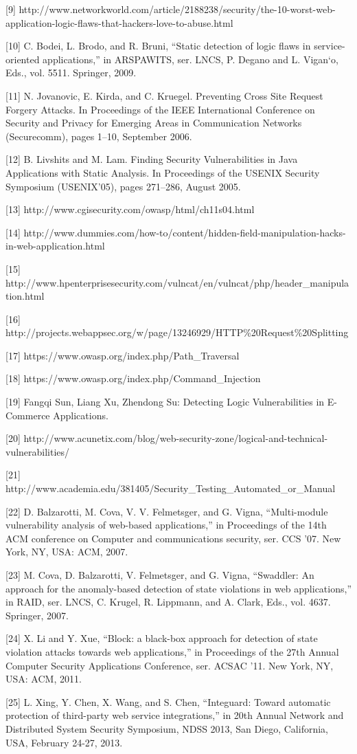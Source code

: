 \documentclass[11pt]{article}
\begin{document}
[9] http://www.networkworld.com/article/2188238/security/the-10-worst-web-application-logic-flaws-that-hackers-love-to-abuse.html

[10] C. Bodei, L. Brodo, and R. Bruni, “Static detection of logic flaws in service-oriented applications,” in ARSPAWITS, ser. LNCS, P. Degano and L. Vigan`o, Eds., vol. 5511. Springer, 2009.

[11] N. Jovanovic, E. Kirda, and C. Kruegel. Preventing Cross Site Request Forgery Attacks. In Proceedings of the IEEE International Conference on Security and Privacy for Emerging Areas in Communication Networks (Securecomm), pages 1–10, September 2006.

[12] B. Livshits and M. Lam. Finding Security Vulnerabilities in Java Applications with Static Analysis. In Proceedings of the USENIX Security Symposium (USENIX’05), pages 271–286, August 2005.

[13] http://www.cgisecurity.com/owasp/html/ch11s04.html

[14] http://www.dummies.com/how-to/content/hidden-field-manipulation-hacks-in-web-application.html

[15] http://www.hpenterprisesecurity.com/vulncat/en/vulncat/php/header_manipulation.html

[16] http://projects.webappsec.org/w/page/13246929/HTTP\%20Request\%20Splitting

[17] https://www.owasp.org/index.php/Path_Traversal

[18] https://www.owasp.org/index.php/Command_Injection

[19] Fangqi Sun, Liang Xu, Zhendong Su: Detecting Logic Vulnerabilities in E-Commerce Applications.

[20] http://www.acunetix.com/blog/web-security-zone/logical-and-technical-vulnerabilities/

[21] http://www.academia.edu/381405/Security_Testing_Automated_or_Manual

[22] D. Balzarotti, M. Cova, V. V. Felmetsger, and G. Vigna, “Multi-module vulnerability analysis of web-based applications,” in Proceedings of the 14th ACM conference on Computer and communications security, ser. CCS ’07. New York, NY, USA: ACM, 2007.

[23] M. Cova, D. Balzarotti, V. Felmetsger, and G. Vigna, “Swaddler: An approach for the anomaly-based detection of state violations in web applications,” in RAID, ser. LNCS, C. Krugel, R. Lippmann, and A. Clark, Eds., vol. 4637. Springer, 2007.

[24] X. Li and Y. Xue, “Block: a black-box approach for detection of state violation attacks towards web applications,” in Proceedings of the 27th Annual Computer Security Applications Conference, ser. ACSAC ’11. New York, NY, USA: ACM, 2011.

[25] L. Xing, Y. Chen, X. Wang, and S. Chen, “Integuard: Toward automatic protection of third-party web service integrations,” in 20th Annual Network and Distributed System Security Symposium, NDSS 2013, San Diego, California, USA, February 24-27, 2013.
\end{document}
